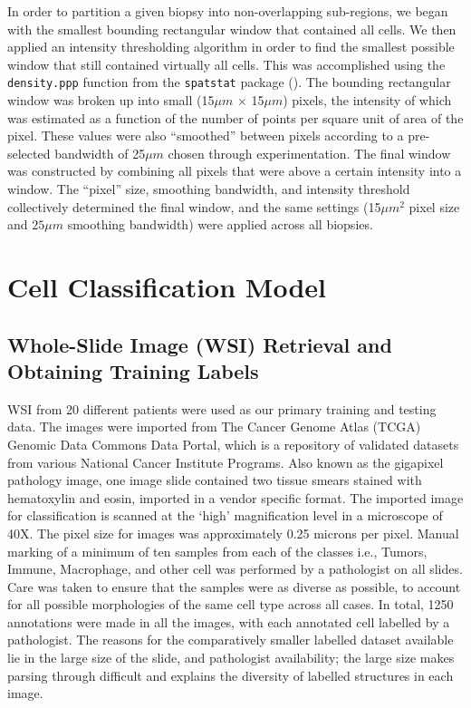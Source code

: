 \documentclass[
]{book}
\begin{document}
In order to partition a given biopsy into non-overlapping sub-regions, we began with the smallest bounding rectangular window that contained all cells. We then applied an intensity thresholding algorithm in order to find the smallest possible window that still contained virtually all cells. This was accomplished using the \texttt{density.ppp} function from the \texttt{spatstat} package (\citet{BT05}). The bounding rectangular window was broken up into small (15\(\mu m\) \(\times\) 15\(\mu m\)) pixels, the intensity of which was estimated as a function of the number of points per square unit of area of the pixel. These values were also ``smoothed'' between pixels according to a pre-selected bandwidth of 25\(\mu m\) chosen through experimentation. The final window was constructed by combining all pixels that were above a certain intensity into a window. The ``pixel'' size, smoothing bandwidth, and intensity threshold collectively determined the final window, and the same settings (15\(\mu m^2\) pixel size and \(25\mu m\) smoothing bandwidth) were applied across all biopsies.

\hypertarget{cell-classification-model}{%
\chapter{Cell Classification Model}\label{cell-classification-model}}

\hypertarget{whole-slide-image-wsi-retrieval-and-obtaining-training-labels}{%
\section{Whole-Slide Image (WSI) Retrieval and Obtaining Training Labels}\label{whole-slide-image-wsi-retrieval-and-obtaining-training-labels}}

WSI from 20 different patients were used as our primary training and testing data. The images were imported from The Cancer Genome Atlas (TCGA) Genomic Data Commons Data Portal, which is a repository of validated datasets from various National Cancer Institute Programs. Also known as the gigapixel pathology image, one image slide contained two tissue smears stained with hematoxylin and eosin, imported in a vendor specific format. The imported image for classification is scanned at the `high' magnification level in a microscope of 40X. The pixel size for images was approximately 0.25 microns per pixel. Manual marking of a minimum of ten samples from each of the classes i.e., Tumors, Immune, Macrophage, and other cell was performed by a pathologist on all slides. Care was taken to ensure that the samples were as diverse as possible, to account for all possible morphologies of the same cell type across all cases. In total, 1250 annotations were made in all the images, with each annotated cell labelled by a pathologist. The reasons for the comparatively smaller labelled dataset available lie in the large size of the slide, and pathologist availability; the large size makes parsing through difficult and explains the diversity of labelled structures in each image.
\end{document}
